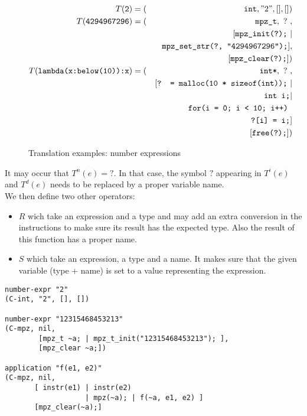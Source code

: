 \documentclass[12pt,a4paper]{article}
\newcommand{\cl}[1]{\texttt{#1}}
\begin{document}
\begin{figure}[!ht]
\begin{eqnarray*}
T(\cl{2}) &= (& \cl{int}, "2", [], []) \\
T(\cl{4294967296}) &= (& \cl{mpz\_t}, \ ? \ , \\
&& [ \cl{mpz\_init(?);} \ | \\
&& \ \cl{mpz\_set\_str(?, "4294967296");} ],\\
&& [ \cl{mpz\_clear(?);} ]) \\
T(\cl{lambda(x:below(10)):x}) &= (& \cl{int*}, \ ? \ , \\
&& [ \cl{? = malloc(10 * sizeof(int));} \ | \\
&& \ \cl{int i;} | \\
&& \ \cl{for(i = 0; i < 10; i++) }\\
&& \ \ \ \cl{?[i] = i;}  ]\\
&& [ \cl{free(?);} ])
\end{eqnarray*}
\caption{Translation examples: number expressions}
\end{figure}

It may occur that $T^n(e) = ?$. In that case, the symbol $?$ appearing in $T^i(e)$ and $T^d(e)$ needs to be replaced by a proper variable name.\\

We then define two other operators:
\begin{itemize}
\item $R$ wich take an expression and a type and may add an extra conversion in the instructions to make sure its result has the expected type. Also the result of this function has a proper name.
\item $S$ which take an expression, a type and a name. It makes sure that the given variable (type + name) is set to a value representing the expression.
\end{itemize}






\begin{lstlisting}
number-expr "2"
(C-int, "2", [], [])

number-expr "12315468453213"
(C-mpz, nil,
        [mpz_t ~a; | mpz_t_init("12315468453213"); ],
        [mpz_clear ~a;])

application "f(e1, e2)"
(C-mpz, nil,
       [ instr(e1) | instr(e2)
                   | mpz(~a); | f(~a, e1, e2) ]
       [mpz_clear(~a);]
\end{lstlisting}
\end{document}
